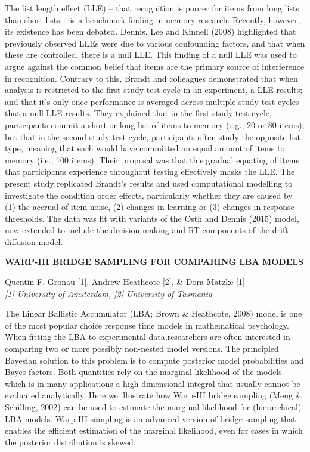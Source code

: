 \documentclass[]{article}
\begin{document}
The list length effect (LLE) -- that recognition is poorer for items
from long lists than short lists -- is a benchmark finding in memory
research. Recently, however, its existence has been debated. Dennis, Lee
and Kinnell (2008) highlighted that previously observed LLEs were due to
various confounding factors, and that when these are controlled, there
is a null LLE. This finding of a null LLE was used to argue against the
common belief that items are the primary source of interference in
recognition. Contrary to this, Brandt and colleagues demonstrated that
when analysis is restricted to the first study-test cycle in an
experiment, a LLE results; and that it's only once performance is
averaged across multiple study-test cycles that a null LLE results. They
explained that in the first study-test cycle, participants commit a
short or long list of items to memory (e.g., 20 or 80 items); but that
in the second study-test cycle, participants often study the opposite
list type, meaning that each would have committed an equal amount of
items to memory (i.e., 100 items). Their proposal was that this gradual
equating of items that participants experience throughout testing
effectively masks the LLE. The present study replicated Brandt's results
and used computational modelling to investigate the condition order
effects, particularly whether they are caused by (1) the accrual of
item-noise, (2) changes in learning or (3) changes in response
thresholds. The data was fit with variants of the Osth and Dennis (2015)
model, now extended to include the decision-making and RT components of
the drift diffusion model.\\
\pagebreak  

\textbf{WARP-III BRIDGE SAMPLING FOR COMPARING LBA MODELS}

Quentin F. Gronau {[}1{]}, Andrew Heathcote {[}2{]}, \& Dora Matzke
{[}1{]}\\
\emph{{[}1{]} University of Amsterdam, {[}2{]} University of Tasmania}

The Linear Ballistic Accumulator (LBA; Brown \& Heathcote, 2008) model
is one of the most popular choice response time models in mathematical
psychology. When fitting the LBA to experimental data,researchers are
often interested in comparing two or more possibly non-nested model
versions. The principled Bayesian solution to this problem is to compute
posterior model probabilities and Bayes factors. Both quantities rely on
the marginal likelihood of the models which is in many applications a
high-dimensional integral that usually cannot be evaluated analytically.
Here we illustrate how Warp-III bridge sampling (Meng \& Schilling,
2002) can be used to estimate the marginal likelihood for (hierarchical)
LBA models. Warp-III sampling is an advanced version of bridge sampling
that enables the efficient estimation of the marginal likelihood, even
for cases in which the posterior distribution is skewed.\\
\pagebreak  
\end{document}
